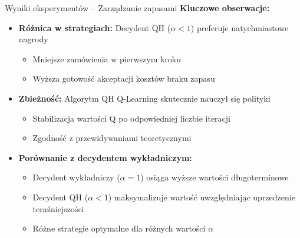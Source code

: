 \begin{frame}{Wyniki eksperymentów -- Zarządzanie zapasami}
\textbf{Kluczowe obserwacje:}

\begin{itemize}
    \item \textbf{Różnica w strategiach:} Decydent QH ($\alpha < 1$) preferuje natychmiastowe nagrody
    \begin{itemize}
        \item Mniejsze zamówienia w pierwszym kroku
        \item Wyższa gotowość akceptacji kosztów braku zapasu
    \end{itemize}
    
    \vspace{0.5em}
    \item \textbf{Zbieżność:} Algorytm QH Q-Learning skutecznie nauczył się polityki
    \begin{itemize}
        \item Stabilizacja wartości Q po odpowiedniej liczbie iteracji
        \item Zgodność z przewidywaniami teoretycznymi
    \end{itemize}
    
    \vspace{0.5em}
    \item \textbf{Porównanie z decydentem wykładniczym:}
    \begin{itemize}
        \item Decydent wykładniczy ($\alpha = 1$) osiąga wyższe wartości długoterminowe
        \item Decydent QH ($\alpha < 1$) maksymalizuje wartość uwzględniając uprzedzenie teraźniejszości
        \item Różne strategie optymalne dla różnych wartości $\alpha$
    \end{itemize}
\end{itemize}
\end{frame}


